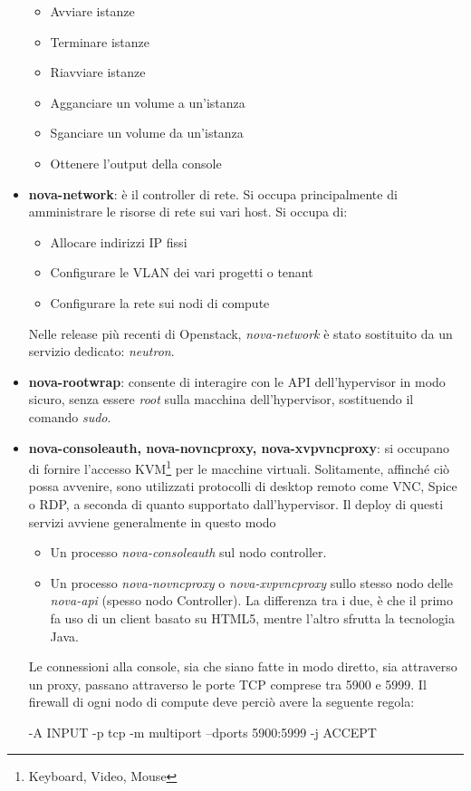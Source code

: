 \documentclass[../main.tex]{subfiles}
\begin{document}
\begin{itemize}
\begin{itemize}
\item Avviare istanze
\item Terminare istanze
\item Riavviare istanze
\item Agganciare un volume a un'istanza
\item Sganciare un volume da un'istanza
\item Ottenere l'output della console
\end{itemize}
\item \textbf{nova-network}: è il controller di rete. Si occupa principalmente di amministrare le risorse di rete sui vari host. Si occupa di:
\begin{itemize}
\item Allocare indirizzi IP fissi
\item Configurare le VLAN dei vari progetti o tenant
\item Configurare la rete sui nodi di compute
\end{itemize}
Nelle release più recenti di Openstack, \textit{nova-network} è stato sostituito da un servizio dedicato: \textit{neutron}.
\item \textbf{nova-rootwrap}: consente di interagire con le API dell'hypervisor in modo sicuro, senza essere \textit{root} sulla macchina dell'hypervisor, sostituendo il comando \textit{sudo}.
\item \textbf{nova-consoleauth, nova-novncproxy, nova-xvpvncproxy}: si occupano di fornire l'accesso KVM\footnote{Keyboard, Video, Mouse} per le macchine virtuali. Solitamente, affinché ciò possa avvenire, sono utilizzati protocolli di desktop remoto come VNC, Spice o RDP, a seconda di quanto supportato dall'hypervisor.
Il deploy di questi servizi avviene generalmente in questo modo
\begin{itemize}
\item Un processo \textit{nova-consoleauth} sul nodo controller.
\item Un processo \textit{nova-novncproxy} o \textit{nova-xvpvncproxy} sullo stesso nodo delle \textit{nova-api} (spesso nodo Controller). La differenza tra i due, è che il primo fa uso di un client basato su HTML5, mentre l'altro sfrutta la tecnologia Java. 
\end{itemize}
Le connessioni alla console, sia che siano fatte in modo diretto, sia attraverso un proxy, passano attraverso le porte TCP comprese tra 5900 e 5999. Il firewall di ogni nodo di compute deve perciò avere la seguente regola:
\begin{python}
-A INPUT -p tcp -m multiport --dports 5900:5999 -j ACCEPT
\end{python}
\end{itemize}
\end{document}
